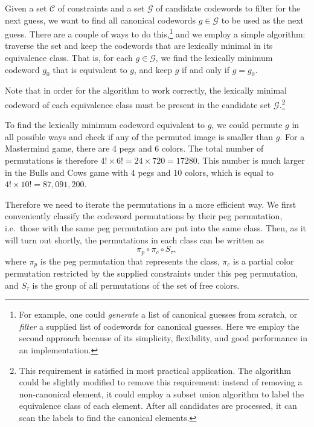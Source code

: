 Given a set $\mathcal{C}$ of constraints and a set $\mathcal{G}$ of candidate codewords to filter for the next guess, we want to find all canonical codewords $g \in \mathcal{G}$ to be used as the next guess. There are a couple of ways to do this,\footnote{For example, one could \emph{generate} a list of canonical guesses from scratch, or \emph{filter} a supplied list of codewords for canonical guesses. Here we employ the second approach because of its simplicity, flexibility, and good performance in an implementation.}
and we employ a simple algorithm: traverse the set and keep the codewords that are lexically minimal in its equivalence class. That is, for each $g \in \mathcal{G}$, we find the lexically minimum codeword $g_0$ that is equivalent to $g$, and keep $g$ if and only if $g = g_0$. 

Note that in order for the algorithm to work correctly, the lexically minimal codeword of each equivalence class must be present in the candidate set $\mathcal{G}$.\footnote{
This requirement is satisfied in most practical application. The algorithm could be slightly modified to remove this requirement: instead of removing a non-canonical element, it could employ a subset union algorithm to label the equivalence class of each element. After all candidates are processed, it can scan the labels to find the canonical elements.
}


To find the lexically minimum codeword equivalent to $g$, we could permute $g$ in all possible ways and check if any of the permuted image is smaller than $g$. For a Mastermind game, there are 4 pegs and 6 colors. The total number of permutations is therefore $4! \times 6! = 24 \times 720 = 17280$. This number is much larger in the Bulls and Cows game with 4 pegs and 10 colors, which is equal to $4! \times 10! = 87,091,200$.

Therefore we need to iterate the permutations in a more efficient way. We first conveniently classify the codeword permutations by their peg permutation, i.e.\ those with the same peg permutation are put into the same class. Then, as it will turn out shortly, the permutations in each class can be written as
\[
\pi_p \circ \pi_c \circ S_\tau ,
\]
where $\pi_p$ is the peg permutation that represents the class, $\pi_c$ is a partial color permutation restricted by the supplied constraints under this peg permutation, and $S_\tau$ is the group of all permutations of the set of free colors.


